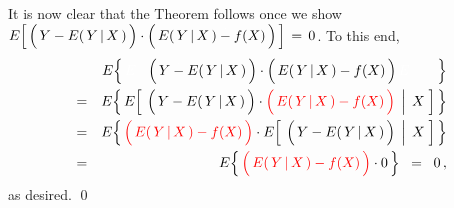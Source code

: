 It is now clear that the Theorem follows once we show
$E\!\left[\,
	\left(\,Y \overset{{\color{white}.}}{-} E(\,Y\,\vert\,X\,)\,\right)
	\cdot
	\left(\,E(\,Y\,\vert\,X\,) \overset{{\color{white}.}}{-} f(X)\,\right)
	\,\right] \,=\, 0$.
To this end,
\begin{eqnarray*}
&&
	E\!\left\{\,
	{\color{white}E\;\;\,}
	\left(\,Y \overset{{\color{white}.}}{-} E(\,Y\,\vert\,X\,)\,\right)
	\cdot
	\left(\,E(\,Y\,\vert\,X\,) \overset{{\color{white}.}}{-} f(X)\,\right)
	{\color{white}E\quad\;\;\;}
	\,\right\}
\\
&=&
	E\!\left\{\,
	E\!\left[\;
		\left.
		\left(\,Y \overset{{\color{white}.}}{-} E(\,Y\,\vert\,X\,)\,\right)
		\cdot
		{\color{red}\left(\,E(\,Y\,\vert\,X\,) \overset{{\color{white}.}}{-} f(X)\,\right)}
		\;\,\right\vert\;X
	\;\right]
	\,\right\}
\\
&=&
	E\!\left\{\,
	{\color{red}\left(\,E(\,Y\,\vert\,X\,) \overset{{\color{white}.}}{-} f(X)\,\right)}
	\cdot
	E\!\left[\;
		\left.
		\left(\,Y \overset{{\color{white}.}}{-} E(\,Y\,\vert\,X\,)\,\right)		
		\;\,\right\vert\;X
	\;\right]
	\,\right\}
\\
&=&
	E\!\left\{\,
	{\color{red}\left(\,E(\,Y\,\vert\,X\,) \overset{{\color{white}.}}{-} f(X)\,\right)}
	\cdot 0
	\,\right\}
	\;\; = \;\; 0\,,
\end{eqnarray*}
as desired.
\qed

